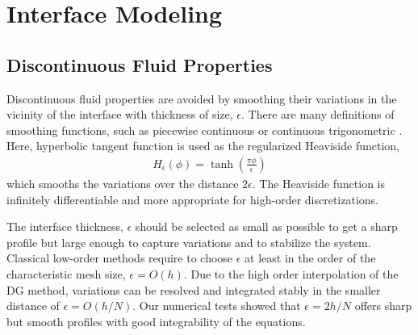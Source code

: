 \documentclass[11pt,a4paper,twoside]{article}
\begin{document}
	
	
	\section{Interface Modeling}
	\label{Sec.Interface Modeling}
	\subsection{Discontinuous Fluid Properties}
	
	Discontinuous fluid properties are avoided by smoothing their variations in the vicinity of the interface with thickness of size, $ \epsilon $. There are many definitions of smoothing functions, such as piecewise continuous \cite{grooss_level_2006} or continuous trigonometric \cite{sussman_adaptive_1999}. Here, hyperbolic tangent function is used as the regularized Heaviside function, 
	\begin{equation}
	\label{Eq.RegularizedHeavisideFunction}
	\begin{aligned}
	H_{\epsilon}(\phi) = \tanh(\frac{\pi\phi}{\epsilon})
	\end{aligned}
	\end{equation}
	which smooths the variations over the distance $ 2\epsilon $. The Heaviside function is infinitely differentiable and  more appropriate for high-order discretizations. 
	
	The interface thickness, $ \epsilon $ should be selected as small as possible to get a sharp profile but large enough to capture variations and to stabilize the system. Classical low-order methods  require to choose $ \epsilon $  at least in the order of the characteristic mesh size, $\epsilon = O(h)$. Due to the high order interpolation  of the DG method, variations can be resolved and integrated stably in the smaller distance of $ \epsilon = O(h/N)$. Our numerical tests showed that $ \epsilon = 2h/N $ offers sharp but smooth profiles with good integrability of the equations.
	
\end{document}
